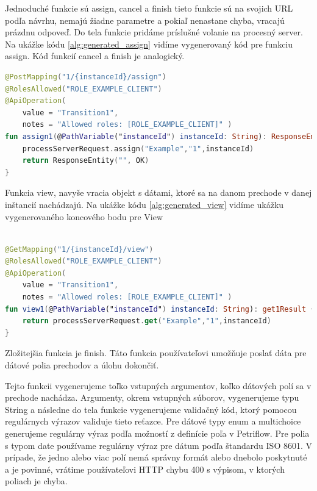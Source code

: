 Jednoduché funkcie sú assign, cancel a finish tieto funkcie sú na svojich URL podľa návrhu, nemajú žiadne parametre a pokiaľ nenastane chyba, vracajú prázdnu odpoveď. Do tela funkcie pridáme príslušné volanie na procesný server. Na ukážke kódu \ref{alg:generated_assign} vidíme vygenerovaný kód pre funkciu assign. Kód funkcií cancel a finish je analogický.

\begin{lstlisting}[float, caption={Príklad vygenerovanej funkcie},label={alg:generated_assign},language=Kotlin]
@PostMapping("1/{instanceId}/assign")
@RolesAllowed("ROLE_EXAMPLE_CLIENT")
@ApiOperation(
	value = "Transition1",
	notes = "Allowed roles: [ROLE_EXAMPLE_CLIENT]" )
fun assign1(@PathVariable("instanceId") instanceId: String): ResponseEntity<String> {
	processServerRequest.assign("Example","1",instanceId)
	return ResponseEntity("", OK)
}
\end{lstlisting}

Funkcia view, navyše vracia objekt s dátami, ktoré sa na danom prechode v danej inštancií nachádzajú. Na ukážke kódu \ref{alg:generated_view} vidíme ukážku vygenerovaného koncového bodu pre View

\begin{lstlisting}[float, caption={Príklad vygenerovanej funkcie},label={alg:generated_view},language=Kotlin]

@GetMapping("1/{instanceId}/view")
@RolesAllowed("ROLE_EXAMPLE_CLIENT")
@ApiOperation(
	value = "Transition1",
	notes = "Allowed roles: [ROLE_EXAMPLE_CLIENT]" )
fun view1(@PathVariable("instanceId") instanceId: String): get1Result {
	return processServerRequest.get("Example","1",instanceId)
}
\end{lstlisting}


Zložitejšia funkcia je finish. Táto funkcia používateľovi umožňuje poslať dáta pre dátové polia prechodov a úlohu dokončiť.

Tejto funkcii vygenerujeme toľko vstupných argumentov, koľko dátových polí sa v prechode nachádza. Argumenty, okrem vstupných súborov, vygenerujeme typu String a následne do tela funkcie vygenerujeme validačný kód, ktorý pomocou regulárnych výrazov validuje tieto reťazce. Pre dátové typy enum a multichoice generujeme regulárny výraz podľa možností z definície poľa v Petriflow. Pre polia s typom date používame regulárny výraz pre dátum podľa štandardu ISO 8601. V prípade, že jedno alebo viac polí nemá správny formát alebo dnebolo poskytnuté a je povinné, vrátime používateľovi HTTP chybu 400 s výpisom, v ktorých poliach je chyba.

